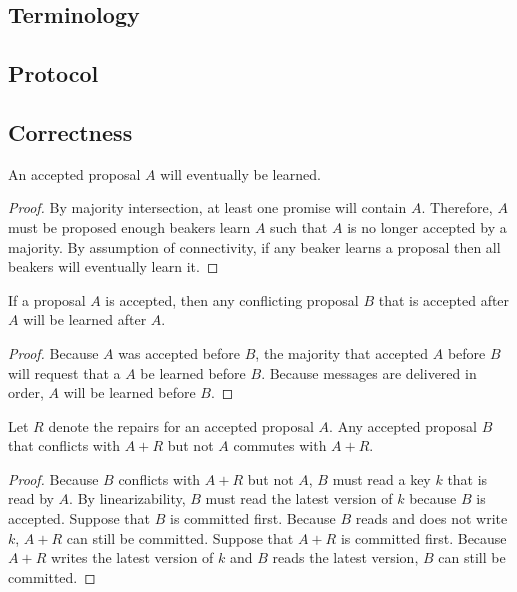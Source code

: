 \documentclass[../main.tex]{subfiles}
\begin{document}
  \subsection{Terminology}

  \subsection{Protocol}

  \subsection{Correctness}

  \begin{theorem}[Liveness]
    An accepted proposal $A$ will eventually be learned.
  \end{theorem}
  \begin{proof}
    By majority intersection, at least one promise will contain $A$. Therefore, $A$ must be proposed
    enough beakers learn $A$ such that $A$ is no longer accepted by a majority. By assumption of
    connectivity, if any beaker learns a proposal then all beakers will eventually learn it.
  \end{proof}

  \begin{theorem}[Linearizability]
    If a proposal $A$ is accepted, then any conflicting proposal $B$ that is accepted after $A$ will
    be learned after $A$.
  \end{theorem}
  \begin{proof}
    Because $A$ was accepted before $B$, the majority that accepted $A$ before $B$ will request that
    a $A$ be learned before $B$. Because messages are delivered in order, $A$ will be learned before
    $B$.
  \end{proof}

  \begin{theorem}[Commutativity]
    Let $R$ denote the repairs for an accepted proposal $A$. Any accepted proposal $B$ that
    conflicts with $A + R$ but not $A$ commutes with $A + R$.
  \end{theorem}
  \begin{proof}
    Because $B$ conflicts with $A + R$ but not $A$, $B$ must read a key $k$ that is read by $A$. By
    linearizability, $B$ must read the latest version of $k$ because $B$ is accepted. Suppose that
    $B$ is committed first. Because $B$ reads and does not write $k$, $A + R$ can still be
    committed. Suppose that $A + R$ is committed first. Because $A + R$ writes the latest version of
    $k$ and $B$ reads the latest version, $B$ can still be committed.
  \end{proof}
\end{document}
